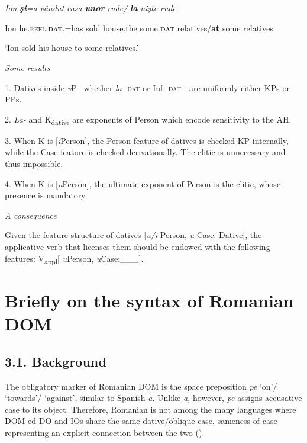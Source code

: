 \documentclass[output=paper,colorlinks,citecolor=brown]{./langscibook}
\begin{document}
\ea%
    \label{ex:key:21}
    \gll\\
        \\
    \glt
    \z

          \textit{Ion}  \textbf{\textit{şi}}\textit{=a}  \textit{vândut}     \textit{casa}   \textbf{\textit{unor}}      \textit{rude/}   \textbf{\textit{la} }\textit{nişte} \textit{rude}.

  Ion   he.\textsc{refl.}\textbf{\textsc{dat}}.=has sold house.the some.\textbf{\textsc{dat} }relatives/\textbf{at} some relatives

  ‘Ion sold his house to some relatives.’

\textit{Some} \textit{results}

1. Datives inside \textit{v}P –whether \textit{la}{}- \textsc{dat} or Inf- \textsc{dat} - are uniformly either KPs or PPs.

2. \textit{La-} and K\textsubscript{dative} are exponents of Person which encode sensitivity to the AH.

3. When K is [\textit{i}Person], the Person feature of datives is checked KP-internally, while the Case feature is checked derivationally. The clitic is unnecessary and thus impossible.

4. When K is [\textit{u}Person], the ultimate exponent of Person is the clitic, whose presence is mandatory.

  \textit{A} \textit{consequence}

Given the feature structure of datives [\textit{u/i} Person, \textit{u} Case: Dative], the applicative verb that licenses them should be endowed with the following features: V\textsubscript{appl}[ \textit{u}Person, \textit{u}Case:\_\_\_].

\section{Briefly on the syntax of Romanian DOM} %

\subsection{\textbf{3.1.} \textbf{Background}}

The obligatory marker of Romanian DOM is the space preposition \textit{pe} ‘on’/ ‘towards’/ ‘against’, similar to Spanish \textit{a}. Unlike \textit{a,} however, \textit{pe} assigns accusative case to its object. Therefore, Romanian is not among the many languages where DOM-ed DO and IOs share the same dative/oblique case, sameness of case representing an explicit connection between the two (\citealt{ManziniFranco2016}).
\end{document}
